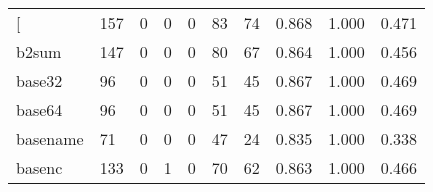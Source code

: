 \begin{longtable}{lp{1.3cm}p{1.3cm}p{1.3cm}p{1.3cm}p{1.3cm}p{1.3cm}p{1.3cm}p{1.3cm}p{1.3cm}}
\bottomrule
\endlastfoot
{[}         &                    157 &                                             0 &                                            0 &                                           0 &                                           83 &                                         74 &                                0.868 &                                  1.000 &                                0.471 \\
b2sum     &                    147 &                                             0 &                                            0 &                                           0 &                                           80 &                                         67 &                                0.864 &                                  1.000 &                                0.456 \\
base32    &                     96 &                                             0 &                                            0 &                                           0 &                                           51 &                                         45 &                                0.867 &                                  1.000 &                                0.469 \\
base64    &                     96 &                                             0 &                                            0 &                                           0 &                                           51 &                                         45 &                                0.867 &                                  1.000 &                                0.469 \\
basename  &                     71 &                                             0 &                                            0 &                                           0 &                                           47 &                                         24 &                                0.835 &                                  1.000 &                                0.338 \\
basenc    &                    133 &                                             0 &                                            1 &                                           0 &                                           70 &                                         62 &                                0.863 &                                  1.000 &                                0.466 \\

\end{longtable}
